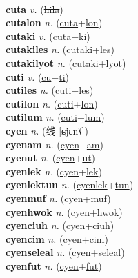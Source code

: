  \label{cuc} \\
\textbf{cuta} \textit{v.} (\hyperref[hila]{\sout{hila}})
 \label{cuta} \\
\textbf{cutalon} \textit{n.} (\hyperref[cuta]{cuta}+\hyperref[lon]{lon})
 \label{cutalon} \\
\textbf{cutaki} \textit{v.} (\hyperref[cuta]{cuta}+\hyperref[ki]{ki})
 \label{cutaki} \\
\textbf{cutakiles} \textit{n.} (\hyperref[cutaki]{cutaki}+\hyperref[les]{les})
 \label{cutakiles} \\
\textbf{cutakilyot} \textit{n.} (\hyperref[cutaki]{cutaki}+\hyperref[lyot]{lyot})
 \label{cutakilyot} \\
\textbf{cuti} \textit{v.} (\hyperref[cu]{cu}+\hyperref[ti]{ti})
 \label{cuti} \\
\textbf{cutiles} \textit{n.} (\hyperref[cuti]{cuti}+\hyperref[les]{les})
 \label{cutiles} \\
\textbf{cutilon} \textit{n.} (\hyperref[cuti]{cuti}+\hyperref[lon]{lon})
 \label{cutilon} \\
\textbf{cutilum} \textit{n.} (\hyperref[cuti]{cuti}+\hyperref[lum]{lum})
 \label{cutilum} \\
\textbf{cyen} \textit{n.} ({\chinese{}线} [ɕjɛn˥˩])
 \label{cyen} \\
\textbf{cyenam} \textit{n.} (\hyperref[cyen]{cyen}+\hyperref[am]{am})
 \label{cyenam} \\
\textbf{cyenut} \textit{n.} (\hyperref[cyen]{cyen}+\hyperref[ut]{ut})
 \label{cyenut} \\
\textbf{cyenlek} \textit{n.} (\hyperref[cyen]{cyen}+\hyperref[lek]{lek})
 \label{cyenlek} \\
\textbf{cyenlektun} \textit{n.} (\hyperref[cyenlek]{cyenlek}+\hyperref[tun]{tun})
 \label{cyenlektun} \\
\textbf{cyenmuf} \textit{n.} (\hyperref[cyen]{cyen}+\hyperref[muf]{muf})
 \label{cyenmuf} \\
\textbf{cyenhwok} \textit{n.} (\hyperref[cyen]{cyen}+\hyperref[hwok]{hwok})
 \label{cyenhwok} \\
\textbf{cyenciuh} \textit{n.} (\hyperref[cyen]{cyen}+\hyperref[ciuh]{ciuh})
 \label{cyenciuh} \\
\textbf{cyencim} \textit{n.} (\hyperref[cyen]{cyen}+\hyperref[cim]{cim})
 \label{cyencim} \\
\textbf{cyenseleal} \textit{n.} (\hyperref[cyen]{cyen}+\hyperref[seleal]{seleal})
 \label{cyenseleal} \\
\textbf{cyenfut} \textit{n.} (\hyperref[cyen]{cyen}+\hyperref[fut]{fut})
